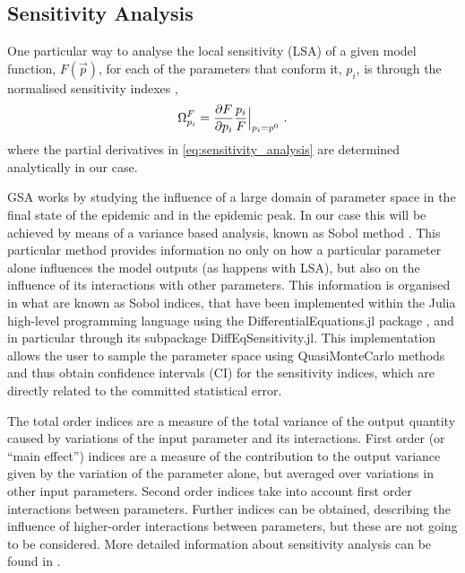 \subsection{Sensitivity Analysis} \label{app:sensanal}

One particular way to analyse the local sensitivity (LSA) of a given model
function, $F(\vec{p})$, for each of the parameters that conform it, $p_i$, is
through the normalised sensitivity indexes \cite{sensitivity_analysis},
\begin{equation}\label{eq:sensitivity_analysis}
    \Omega_{p_i}^{F}=\frac{\partial F}{\partial p_i}\frac{p_i}{F}\Big|_{p_i=p^0}^{} \
    .
\end{equation}
where the partial derivatives in \cref{eq:sensitivity_analysis} are
determined analytically in our case.

GSA works by studying the influence of a large domain of parameter space in
the final state of the epidemic and in the epidemic peak.
In our case this will be achieved by means of a variance based analysis,
known as Sobol method \cite{SOBOL2001271}. This particular method provides
information no only on how a particular parameter alone influences the model
outputs (as happens with LSA), but also on the influence of its interactions
with other parameters. This information is organised in what are known as Sobol
indices, that have been
implemented within the Julia high-level programming language \cite{julia}
using the DifferentialEquations.jl package \cite{DifferentialEquations.jl},
and in particular through its subpackage DiffEqSensitivity.jl. This
implementation allows the user to sample the parameter space using
QuasiMonteCarlo methods and thus obtain confidence intervals (CI) for the
sensitivity indices, which are directly related to the committed statistical
error.

The total order indices are a measure of the total variance of the output
quantity caused by variations of the input parameter and its interactions.
First order (or ``main effect'') indices are a measure of the contribution to
the output variance given by the variation of the parameter alone, but averaged
over variations in other input parameters. Second order indices take into
account first order interactions between parameters. Further indices can be
obtained, describing the influence of higher-order interactions between
parameters, but these are not going to be considered.
More detailed information about sensitivity analysis can be found in
\cite{Sensitivity_analysis_book}.

